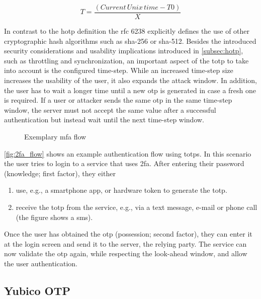 \begin{equation*}
	T = \frac{(Current\, Unix\, time - T0)}{X}
\end{equation*}

In contrast to the \gls{hotp} definition the \gls{rfc} 6238 explicitly defines the use of other cryptographic hash algorithms such as \gls{sha}-256 or \gls{sha}-512. Besides the introduced security considerations and usability implications introduced in \autoref{subsec:hotp}, such as throttling and synchronization, an important aspect of the \gls{totp} to take into account is the configured time-step. While an increased time-step size increases the usability of the user, it also expands the attack window. In addition, the user has to wait a longer time until a new \gls{otp} is generated in case a fresh one is required. If a user or attacker sends the same \gls{otp} in the same time-step window, the server must not accept the same value after a successful authentication but instead wait until the next time-step window.

\begin{figure}[hbt]
	\centering
	
	\caption[Exemplary \gls{mfa} flow]{Exemplary \gls{mfa} flow\footnotemark}
	\label{fig:2fa_flow}
\end{figure}

\autoref{fig:2fa_flow} shows an example authentication flow using \glspl{totp}. In this scenario the user tries to login to a service that uses \gls{2fa}. After entering their password (knowledge; first factor), they either

\begin{enumerate}[label=(\alph*)]
	\item use, e.g., a smartphone app, or hardware token to generate the \gls{totp}.
	\item receive the \gls{totp} from the service, e.g., via a text message, e-mail or phone call (the figure shows a \gls{sms}).
\end{enumerate}

Once the user has obtained the \gls{otp} (possession; second factor), they can enter it at the login screen and send it to the server, the relying party. The service can now validate the \gls{otp} again, while respecting the look-ahead window, and allow the user authentication.

\newpage

\subsection{Yubico OTP}

